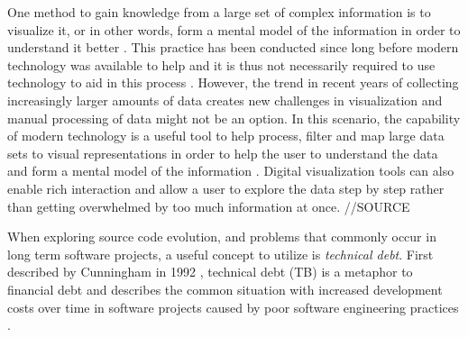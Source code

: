 One method to gain knowledge from a large set of complex information is to visualize it, or in other words, form a mental model of the information in order to understand it better \cite{spence_information_2014}. 
This practice has been conducted since long before modern technology was available to help and it is thus not necessarily required to use technology to aid in this process \cite{friendly_brief_2008}. 
However, the trend in recent years of collecting increasingly larger amounts of data creates new challenges in visualization and manual processing of data might not be an option. 
In this scenario, the capability of modern technology is a useful tool to help process, filter and map large data sets to visual representations in order to help the user to understand the data and form a mental model of the information \cite{card_structure_1997}. 
Digital visualization tools can also enable rich interaction and allow a user to explore the data step by step rather than getting overwhelmed by too much information at once. //SOURCE

When exploring source code evolution, and problems that commonly occur in long term software projects, a useful concept to utilize is \textit{technical debt}.
First described by Cunningham in 1992 \cite{cunningham_wycash_1992}, technical debt (TB) is a metaphor to financial debt and describes the common situation with increased development costs over time in software projects caused by poor software engineering practices \cite{tom_exploration_2013}.
